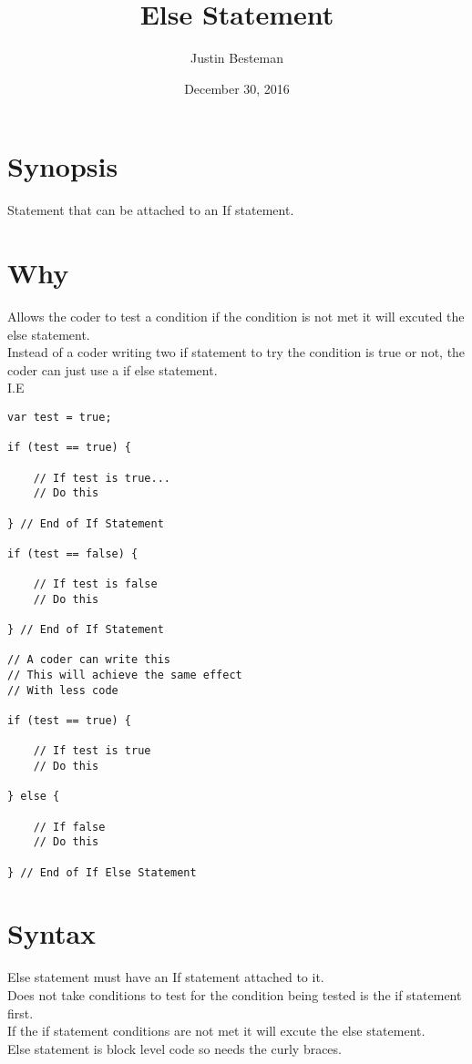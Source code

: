 \documentclass[12pt, letterpaper]{article}
\title{Else Statement}
\author{Justin Besteman}
\date{December 30, 2016}
\begin{document}
\maketitle


\section*{Synopsis}

Statement that can be attached to an If statement. 


\section*{Why}

Allows the coder to test a condition if the condition is not met it will excuted the else statement. \\
Instead of a coder writing two if statement to try the condition is true or not, the coder can just use a if else statement. \\
I.E
\begin{lstlisting}
var test = true;

if (test == true) {

	// If test is true...
	// Do this

} // End of If Statement

if (test == false) {

	// If test is false
	// Do this

} // End of If Statement

// A coder can write this
// This will achieve the same effect 
// With less code

if (test == true) {

	// If test is true
	// Do this

} else {

	// If false
	// Do this

} // End of If Else Statement
\end{lstlisting}

\section*{Syntax}

Else statement must have an If statement attached to it. \\
Does not take conditions to test for the condition being tested is the if statement first. \\ 
If the if statement conditions are not met it will excute the else statement. \\
Else statement is block level code so needs the curly braces.
\end{document}
